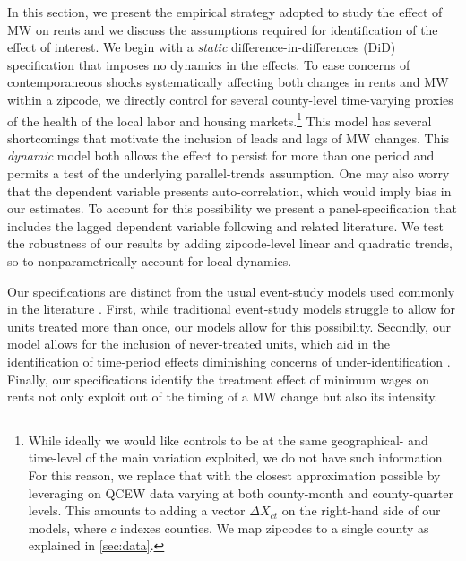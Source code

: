 
In this section, we present the empirical strategy adopted to study the effect of MW 
on rents and we discuss the assumptions required for identification of the effect of 
interest. We begin with a \textit{static} difference-in-differences (DiD) specification 
that imposes no dynamics in the effects. To ease concerns of contemporaneous shocks 
systematically affecting both changes in rents and MW within a zipcode, we 
directly control for several county-level time-varying proxies of the health of the local labor and 
housing markets.\footnote{While ideally we would like 
	controls to be at the same geographical- and time-level of the main variation exploited, we do not have 
	such information. For this reason, we replace that with the closest approximation possible by leveraging 
	on QCEW data varying at both county-month and county-quarter levels.
	This amounts to adding a vector $\Delta X_{ct}$ on the right-hand side of 
	our models, where $c$ indexes counties. We map zipcodes to a single county as explained in 
	\autoref{sec:data}.} This model has several shortcomings that 
motivate the inclusion of leads and lags of MW changes. This \textit{dynamic} model 
both allows the effect to persist for more than one period and permits a test of the 
underlying parallel-trends assumption. One may also worry that the dependent variable 
presents auto-correlation, which would imply bias in our estimates. To account for 
this possibility we present a panel-specification that includes the lagged dependent 
variable following \textcite{ArellanoBond1991} and related literature. We test the 
robustness of our results by adding zipcode-level linear and quadratic trends, so to 
nonparametrically account for local dynamics. 

Our specifications are distinct from the usual event-study models used 
commonly in the literature \parencite[discussed in, e.g.,][]{BorusyakJaravel2017, 
abraham2018}. First, while traditional event-study models struggle to allow for 
units treated more than once, our models allow for this possibility. Secondly, 
our model allows for the inclusion of never-treated units, which aid in the 
identification of time-period effects diminishing concerns of under-identification 
\parencite{BorusyakJaravel2017}. Finally, our specifications identify the treatment 
effect of minimum wages on rents not only exploit out of the timing of a MW change 
but also its intensity.
    
